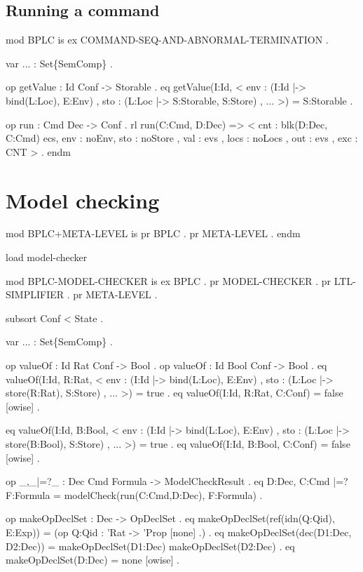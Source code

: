 \documentclass{llncs}%
\begin{document}
\subsection{Running a command}
\nwenddocs{}\endmoddef\nwstartdeflinemarkup\nwenddeflinemarkup
mod BPLC is
    ex COMMAND-SEQ-AND-ABNORMAL-TERMINATION .

    var ... : Set\{SemComp\} .
    
    op getValue : Id Conf -> Storable .
    eq getValue(I:Id, 
          < env : (I:Id |-> bind(L:Loc), E:Env) ,
          sto : (L:Loc |-> S:Storable, S:Store) ,
          ... >) = S:Storable .
                  
    op run : Cmd Dec -> Conf .
    rl run(C:Cmd, D:Dec) =>
        < cnt : blk(D:Dec, C:Cmd) ecs,
          env : noEnv, sto : noStore , val : evs ,
          locs : noLocs , out : evs , exc : CNT > .               
endm
\nwendcode{}\nwdocspar

\section{Model checking}
\nwenddocs{}\endmoddef\nwstartdeflinemarkup\nwenddeflinemarkup
mod BPLC+META-LEVEL is
        pr BPLC . pr META-LEVEL .
endm 

load model-checker

mod BPLC-MODEL-CHECKER is
    ex BPLC .
    pr MODEL-CHECKER .
        pr LTL-SIMPLIFIER .
        pr META-LEVEL .

    subsort Conf < State .
    
    var ... : Set\{SemComp\} .
    
    op valueOf : Id Rat Conf -> Bool .
    op valueOf : Id Bool Conf -> Bool .
    eq valueOf(I:Id, R:Rat,
          < env : (I:Id |-> bind(L:Loc), E:Env) ,
            sto : (L:Loc |-> store(R:Rat), S:Store) ,
            ... >) = true .
    eq valueOf(I:Id, R:Rat, C:Conf) = false [owise] .

    eq valueOf(I:Id, B:Bool,
          < env : (I:Id |-> bind(L:Loc), E:Env) ,
            sto : (L:Loc |-> store(B:Bool), S:Store) ,
            ... >) = true .
    eq valueOf(I:Id, B:Bool, C:Conf) = false [owise] .
        
    op _,_|=?_ : Dec Cmd Formula -> ModelCheckResult .
    eq D:Dec, C:Cmd |=? F:Formula =
           modelCheck(run(C:Cmd,D:Dec), F:Formula) .    
           
    op makeOpDeclSet : Dec -> OpDeclSet .
    eq makeOpDeclSet(ref(idn(Q:Qid), E:Exp)) = 
           (op Q:Qid : 'Rat -> 'Prop [none] .) .
    eq makeOpDeclSet(dec(D1:Dec, D2:Dec)) = 
           makeOpDeclSet(D1:Dec) makeOpDeclSet(D2:Dec) .
    eq makeOpDeclSet(D:Dec) = none [owise] . 
    
\end{document}
